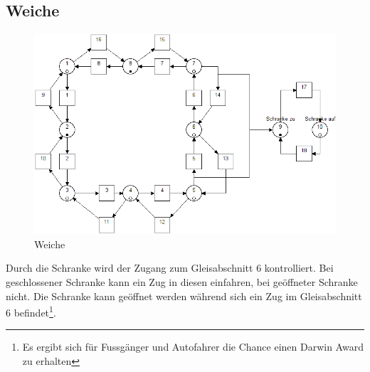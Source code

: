 \documentclass[10pt]{scrartcl}
\begin{document}
	\subsection{Weiche}	
		\begin{figure}[H]
			\includegraphics[width=\textwidth]{aufgabe21.png}
        	\caption{Weiche}
        	\label{img:aufg2}
		\end{figure}
	Durch die Schranke wird der Zugang zum Gleisabschnitt 6 kontrolliert. Bei geschlossener Schranke kann ein Zug in diesen einfahren, bei geöffneter Schranke nicht. Die Schranke kann geöffnet werden während sich ein Zug im Gleisabschnitt 6 befindet\footnote{Es ergibt sich für Fussgänger und Autofahrer die Chance einen Darwin Award zu erhalten}.	
		
\end{document}
